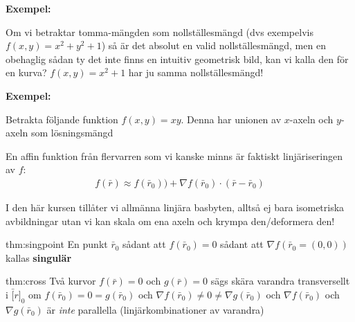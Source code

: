 \par\bigskip
\noindent\textbf{Exempel:}\par
\noindent Om vi betraktar tomma-mängden som nollställesmängd (dvs exempelvis $f(x,y) = x^2+y^2+1$) så är det absolut en valid nollställesmängd, men en obehaglig sådan ty det inte finns en intuitiv geometrisk bild, kan vi kalla den för en kurva? $f(x,y) = x^2+1$ har ju samma nollställesmängd!
\par\bigskip
\noindent\textbf{Exempel:}\par
\noindent Betrakta följande funktion $f(x,y)=xy$. Denna har unionen av $x$-axeln och $y$-axeln som lösningsmängd
\par\bigskip
\noindent En affin funktion från flervarren som vi kanske minns är faktiskt linjäriseringen av $f$:
\begin{equation*}
  \begin{gathered}
    f(\bar{r})\approx f(\bar{r}_0))+\nabla f(\bar{r}_0)\cdot (\bar{r}-\bar{r}_0)
  \end{gathered}
\end{equation*}
\par\bigskip
\noindent I den här kursen tillåter vi allmänna linjära basbyten, alltså ej bara isometriska avbildningar utan vi kan skala om ena axeln och krympa den/deformera den!
\par\bigskip
\begin{theo}{thm:singpoint}
  En punkt $\bar{r}_0$ sådant att $f(\bar{r}_0)=0$ sådant att $\nabla f(\bar{r}_0=(0,0))$ kallas \textbf{singulär}
\end{theo}
\par\bigskip
\begin{theo}{thm:cross}
  Två kurvor $f(\bar{r})= 0$ och $g(\bar{r})=0$ sägs skära varandra transversellt i $\bar[r]_0$ om $f(\bar{r}_0) = 0 = g(\bar{r}_0)$ och $\nabla f(\bar{r}_0) \neq 0 \neq \nabla g(\bar{r}_0)$ och $\nabla f(\bar{r}_0)$ och $\nabla g(\bar{r}_0)$ är \textit{inte} parallella (linjärkombinationer av varandra)
\end{theo}
